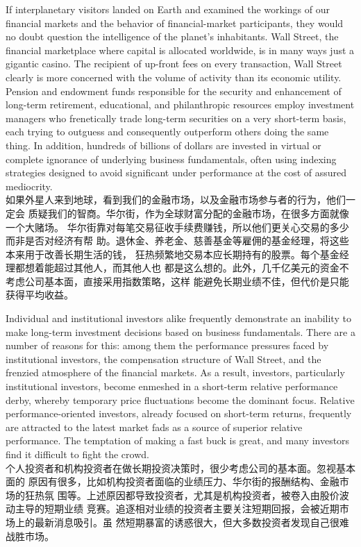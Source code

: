\begin{verseparallel}
  {
    If interplanetary visitors landed on Earth and examined the workings of our
    financial markets and the behavior of financial-market participants, they
    would no doubt question the intelligence of the planet's inhabitants. Wall
    Street, the financial marketplace where capital is allocated worldwide, is
    in many ways just a gigantic casino. The recipient of up-front fees on every
    transaction, Wall Street clearly is more concerned with the volume of
    activity than its economic utility. Pension and endowment funds responsible
    for the security and enhancement of long-term retirement, educational, and
    philanthropic resources employ investment managers who frenetically trade
    long-term securities on a very short-term basis, each trying to outguess and
    consequently outperform others doing the same thing. In addition, hundreds
    of billions of dollars are invested in virtual or complete ignorance of
    underlying business fundamentals, often using indexing strategies designed
    to avoid significant under performance at the cost of assured mediocrity. \\
  }
  {
    如果外星人来到地球，看到我们的金融市场，以及金融市场参与者的行为，他们一定会
    质疑我们的智商。华尔街，作为全球财富分配的金融市场，在很多方面就像一个大赌场。
    华尔街靠对每笔交易征收手续费赚钱，所以他们更关心交易的多少而非是否对经济有帮
    助。退休金、养老金、慈善基金等雇佣的基金经理，将这些本来用于改善长期生活的钱，
    狂热频繁地交易本应长期持有的股票。每个基金经理都想着能超过其他人，而其他人也
    都是这么想的。此外，几千亿美元的资金不考虑公司基本面，直接采用指数策略，这样
    能避免长期业绩不佳，但代价是只能获得平均收益。
  }
\end{verseparallel}

\begin{verseparallel}
  {
    Individual and institutional investors alike frequently demonstrate an
    inability to make long-term investment decisions based on business
    fundamentals. There are a number of reasons for this: among them the
    performance pressures faced by institutional investors, the compensation
    structure of Wall Street, and the frenzied atmosphere of the financial
    markets. As a result, investors, particularly institutional investors,
    become enmeshed in a short-term relative performance derby, whereby
    temporary price fluctuations become the dominant focus.
    Relative performance-oriented investors, already focused on short-term
    returns, frequently are attracted to the latest market fads as a source of
    superior relative performance. The temptation of making a fast buck is
    great, and many investors find it difficult to fight the crowd. \\
  }
  {
    个人投资者和机构投资者在做长期投资决策时，很少考虑公司的基本面。忽视基本面的
    原因有很多，比如机构投资者面临的业绩压力、华尔街的报酬结构、金融市场的狂热氛
    围等。上述原因都导致投资者，尤其是机构投资者，被卷入由股价波动主导的短期业绩
    竞赛。追逐相对业绩的投资者主要关注短期回报，会被近期市场上的最新消息吸引。虽
    然短期暴富的诱惑很大，但大多数投资者发现自己很难战胜市场。
  }
\end{verseparallel}

